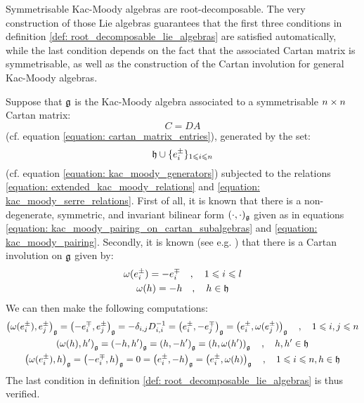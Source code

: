         \begin{example}
            Symmetrisable Kac-Moody algebras are root-decomposable. The very construction of those Lie algebras guarantees that the first three conditions in definition \ref{def: root_decomposable_lie_algebras} are satisfied automatically, while the last condition depends on the fact that the associated Cartan matrix is symmetrisable, as well as the construction of the Cartan involution for general Kac-Moody algebras.
            
            Suppose that $\mathfrak{g}$ is the Kac-Moody algebra associated to a symmetrisable $n \x n$ Cartan matrix:
                $$C = DA$$
            (cf. equation \eqref{equation: cartan_matrix_entries}), generated by the set:
                $$\mathfrak{h} \cup \{e_i^{\pm}\}_{1\leqslant i \leqslant n}$$
            (cf. equation \ref{equation: kac_moody_generators}) subjected to the relations \eqref{equation: extended_kac_moody_relations} and \eqref{equation: kac_moody_serre_relations}. First of all, it is known that there is a non-degenerate, symmetric, and invariant bilinear form $(\cdot, \cdot)_{\mathfrak{g}}$ given as in equations \eqref{equation: kac_moody_pairing_on_cartan_subalgebras} and \eqref{equation: kac_moody_pairing}. Secondly, it is known (see e.g. \cite[Theorem 1.2]{kac_infinite_dimensional_lie_algebras}) that there is a Cartan involution on $\mathfrak{g}$ given by:
                \begin{equation} \label{equation: symmetrisable_kac_moody_cartan_involution}
                    \begin{gathered}
                        \omega(e_i^{\pm}) = -e_i^{\mp} \quad, \quad 1 \leqslant i \leqslant l
                        \\
                        \omega(h) = -h \quad, \quad h \in \mathfrak{h}
                    \end{gathered}
                \end{equation}
            We can then make the following computations:
                \begin{equation} \label{equation: kac_moody_pairing_cartan_equivariance}
                    \begin{gathered}
                        \left( \omega(e_i^{\pm}), e_j^{\pm} \right)_{\mathfrak{g}} = \left( -e_i^{\mp}, e_j^{\pm} \right)_{\mathfrak{g}} = -\delta_{i, j} D_{i, i}^{-1} = \left( e_i^{\pm}, -e_j^{\mp} \right)_{\mathfrak{g}} = \left( e_i^{\pm}, \omega(e_j^{\pm}) \right)_{\mathfrak{g}} \quad, \quad 1 \leqslant i, j \leqslant n
                        \\
                        \left( \omega(h), h' \right)_{\mathfrak{g}} = \left( -h, h' \right)_{\mathfrak{g}} = \left( h, -h' \right)_{\mathfrak{g}} = \left( h, \omega(h') \right)_{\mathfrak{g}} \quad, \quad h, h' \in \mathfrak{h}
                        \\
                        \left( \omega(e_i^{\pm}), h \right)_{\mathfrak{g}} = \left( -e_i^{\mp}, h \right)_{\mathfrak{g}} = 0 = \left( e_i^{\pm}, -h \right)_{\mathfrak{g}} = \left( e_i^{\pm}, \omega(h) \right)_{\mathfrak{g}} \quad, \quad 1 \leqslant i \leqslant n, h \in \mathfrak{h}
                    \end{gathered}
                \end{equation}
            The last condition in definition \ref{def: root_decomposable_lie_algebras} is thus verified.
        \end{example}


